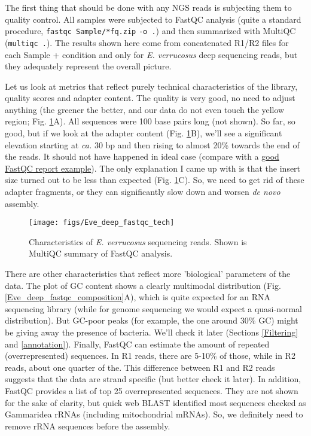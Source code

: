 \documentclass[12pt]{article}
\begin{document}


		
The first thing that should be done with any NGS reads is subjecting them to quality control. All samples were subjected to FastQC analysis (quite a standard procedure, \verb|fastqc Sample/*fq.zip| \verb|-o .|) and then summarized with MultiQC (\verb|multiqc .|). 
The results shown here come from concatenated R1/R2 files for each Sample + condition and only for \textit{E. verrucosus} deep sequencing reads, but they adequately represent the overall picture. 
		
Let us look at metrics that reflect purely technical characteristics of the library, quality scores and adapter content. The quality is very good, no need to adjust anything (the greener the better, and our data do not even touch the yellow region; Fig. \ref{Eve_deep_fastqc_tech}A). All sequences were 100 base pairs long (not shown). So far, so good, but if we look at the adapter content (Fig. \ref{Eve_deep_fastqc_tech}B), we'll see a significant elevation starting at \textit{ca.} 30 bp and then rising to almost 20\% towards the end of the reads. It should not have happened in ideal case (compare with a \href{https://www.bioinformatics.babraham.ac.uk/projects/fastqc/good_sequence_short_fastqc.html#M10}{good FastQC report example}). The only explanation I came up with is that the insert size turned out to be less than expected (Fig. \ref{Eve_deep_fastqc_tech}C). So, we need to get rid of these adapter fragments, or they can significantly slow down and worsen \textit{de novo} assembly.

\begin{figure}[H]
\texttt{[image: figs/Eve\_deep\_fastqc\_tech]}
\caption{Characteristics of \textit{E. verrucosus} sequencing reads. Shown is MultiQC summary of FastQC analysis.} %
\label{Eve_deep_fastqc_tech}
\end{figure}

There are other characteristics that reflect more 'biological' parameters of the data. The plot of GC content shows a clearly multimodal distribution (Fig. \ref{Eve_deep_fastqc_composition}A), which is quite expected for an RNA sequencing library (while for genome sequencing we would expect a quasi-normal distribution). But GC-poor peaks (for example, the one around 30\% GC) might be giving away the presence of bacteria. We'll check it later (Sections \ref{Filtering} and \ref{annotation}). Finally, FastQC can estimate the amount of repeated (overrepresented) sequences. In R1 reads, there are 5-10\% of those, while in R2 reads, about one quarter of the. This difference between R1 and R2 reads suggests that the data are strand specific (but better check it later).
In addition, FastQC provides a list of top 25 overrepresented sequences. They are not shown for the sake of clarity, but quick web BLAST identified most sequences checked as Gammaridea rRNAs (including mitochondrial mRNAs). So, we definitely need to remove rRNA sequences before the assembly.
\end{document}
